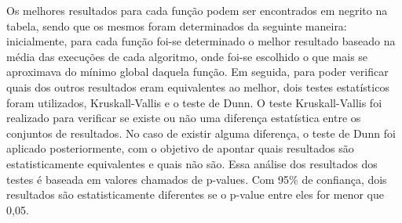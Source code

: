 Os melhores resultados para cada função podem ser encontrados em negrito na tabela, sendo que os mesmos foram determinados da seguinte maneira: inicialmente, para cada função foi-se determinado o melhor resultado baseado na média das execuções de cada algoritmo, onde foi-se escolhido o que mais se aproximava do mínimo global daquela função. Em seguida, para poder verificar quais dos outros resultados eram equivalentes ao melhor, dois testes estatísticos foram utilizados, Kruskall-Vallis e o teste de Dunn. O teste Kruskall-Vallis foi realizado para verificar se existe ou não uma diferença estatística entre os conjuntos de resultados. No caso de existir alguma diferença, o teste de Dunn foi aplicado posteriormente, com o objetivo de apontar quais resultados são estatisticamente equivalentes e quais não são. Essa análise dos resultados dos testes é baseada em valores chamados de p-values. Com 95\% de confiança, dois resultados são estatisticamente diferentes se o p-value entre eles for menor que 0,05.

